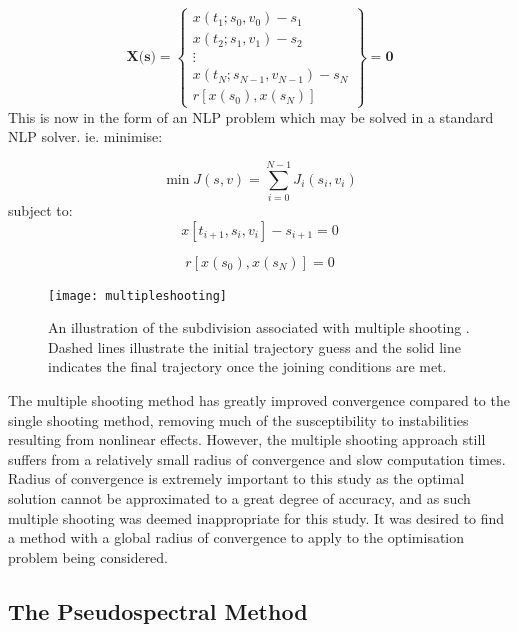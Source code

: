 \begin{equation}
\textbf{X(s)} = \begin{Bmatrix}
x(t_1;s_0,v_0) - s_1 \\
x(t_2;s_1,v_1) - s_2  \\
\vdots    \\
x(t_N;s_{N-1},v_{N-1}) - s_N  \\
r[x(s_0),x(s_N)]
\end{Bmatrix} = \textbf{0}
\end{equation}
This is now in the form of an NLP problem which may be solved in a standard NLP solver. ie. minimise:

\begin{equation}
\min J(s,v) = \sum_{i=0}^{N-1}J_i(s_i,v_i)
\end{equation}
subject to:
\begin{equation}
x[t_{i+1},s_i,v_i] - s_{i+1} = 0
\end{equation}

\begin{equation}
r[x(s_0),x(s_N)] = 0
\end{equation}



\begin{figure}[ht]
	\centering
	\texttt{[image: multipleshooting]}
	\caption{An illustration of the subdivision associated with multiple shooting \cite{Michalik2009}. Dashed lines illustrate the initial trajectory guess and the solid line indicates the final trajectory once the joining conditions are met.}
	\label{fig:multipleshooting}
\end{figure}

The multiple shooting method has greatly improved convergence compared to the single shooting method, removing much of the susceptibility to instabilities resulting from nonlinear effects. However, the multiple shooting approach still suffers from a relatively small radius of convergence and slow computation times. Radius of convergence is extremely important to this study as the optimal solution cannot be approximated to a great degree of accuracy, and as such multiple shooting was deemed inappropriate for this study. It was desired to find a method with a global radius of convergence to apply to the optimisation problem being considered.

\subsection{The Pseudospectral Method}\label{sec:PS}

